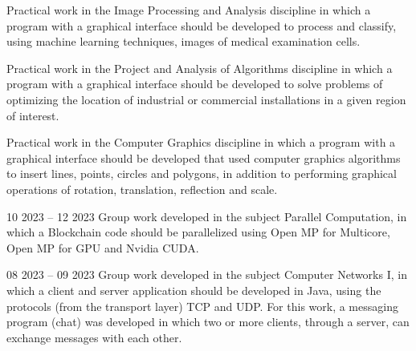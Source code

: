 Practical work in the Image Processing and Analysis discipline in which a program with a graphical interface should be developed to process and classify, using machine learning techniques, images of medical examination cells.\\
\divider

Practical work in the Project and Analysis of Algorithms discipline in which a program with a graphical interface should be developed to solve problems of optimizing the location of industrial or commercial installations in a given region of interest.\\
\divider

Practical work in the Computer Graphics discipline in which a program with a graphical interface should be developed that used computer graphics algorithms to insert lines, points, circles and polygons, in addition to performing graphical operations of rotation, translation, reflection and scale.\\
\divider

{
}{10 2023 -- 12 2023}{}
Group work developed in the subject Parallel Computation, in which a Blockchain code should be parallelized using Open MP for Multicore, Open MP for GPU and Nvidia CUDA.\\
\divider

{
}{08 2023 -- 09 2023}{}
Group work developed in the subject Computer Networks I, in which a client and server application should be developed in Java, using the protocols (from the transport layer) TCP and UDP. For this work, a messaging program (chat) was developed in which two or more clients, through a server, can exchange messages with each other.\\
\divider
        
